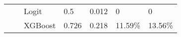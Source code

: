 \documentclass[11pt]{report}
\begin{document}
\begin{table}[]
\begin{tabular}{lllllll}
                                                                                          &  & Logit                                                         & 0.5                                                   & 0.012                                                 & 0                                                        & 0                                                        \\ \cline{3-7} 
                                                                                          &  & XGBoost                                                       & 0.726                                                 & 0.218                                                 & 11.59\%                                                  & 13.56\%                                                  \\ \hline
\end{tabular}
\end{table}
\end{document}
